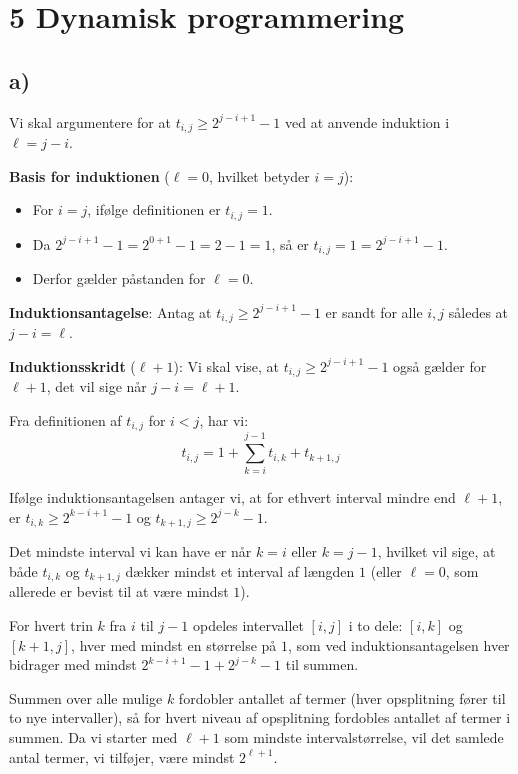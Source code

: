\documentclass{article}
\begin{document}
\section*{5 Dynamisk programmering}

\subsection*{a)}

Vi skal argumentere for at $t_{i, j} \geq 2^{j-i+1}-1$ ved at anvende induktion i $\ell=j-i$.

\textbf{Basis for induktionen} ($\ell=0$, hvilket betyder $i=j$):

\begin{itemize}
  \item For $i=j$, ifølge definitionen er $t_{i, j} = 1$.
  \item Da $2^{j-i+1}-1 = 2^{0+1}-1 = 2-1 = 1$, så er $t_{i, j} = 1 = 2^{j-i+1}-1$.
  \item Derfor gælder påstanden for $\ell=0$.
\end{itemize}

\textbf{Induktionsantagelse}:
Antag at $t_{i, j} \geq 2^{j-i+1}-1$ er sandt for alle $i, j$ således at $j-i = \ell$.

\textbf{Induktionsskridt} ($\ell+1$):
Vi skal vise, at $t_{i, j} \geq 2^{j-i+1}-1$ også gælder for $\ell+1$, det vil sige når $j-i=\ell+1$.

Fra definitionen af $t_{i, j}$ for $i<j$, har vi:
\[
t_{i, j} = 1 + \sum_{k=i}^{j-1} t_{i, k} + t_{k+1, j}
\]

Ifølge induktionsantagelsen antager vi, at for ethvert interval mindre end $\ell+1$, er $t_{i, k} \geq 2^{k-i+1}-1$ og $t_{k+1, j} \geq 2^{j-k}-1$.

Det mindste interval vi kan have er når $k=i$ eller $k=j-1$, hvilket vil sige, at både $t_{i, k}$ og $t_{k+1, j}$ dækker mindst et interval af længden $1$ (eller $\ell=0$, som allerede er bevist til at være mindst $1$).

For hvert trin $k$ fra $i$ til $j-1$ opdeles intervallet $[i, j]$ i to dele: $[i, k]$ og $[k+1, j]$, hver med mindst en størrelse på $1$, som ved induktionsantagelsen hver bidrager med mindst $2^{k-i+1}-1 + 2^{j-k}-1$ til summen.

Summen over alle mulige $k$ fordobler antallet af termer (hver opsplitning fører til to nye intervaller), så for hvert niveau af opsplitning fordobles antallet af termer i summen. Da vi starter med $\ell+1$ som mindste intervalstørrelse, vil det samlede antal termer, vi tilføjer, være mindst $2^{\ell+1}$.
\end{document}
